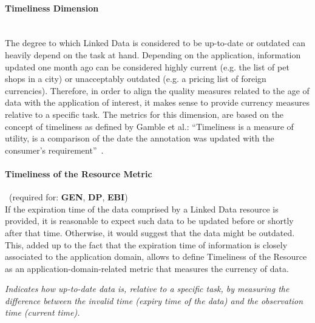 
\paragraph{Timeliness Dimension}~\\ %
The degree to which Linked Data is considered to be up-to-date or outdated can heavily depend on the task at hand. Depending on the application, information updated one month ago can be considered highly current (e.g. the list of pet shops in a city) or unacceptably outdated (e.g. a pricing list of foreign currencies). Therefore, in order to align the quality measures related to the age of data with the application of interest, it makes sense to provide currency measures relative to a specific task. The metrics for this dimension, are based on the concept of timeliness as defined by Gamble et al.: ``Timeliness is a measure of utility, is a comparison of the date the annotation was updated with the consumer's requirement''~\cite{Gamble2011}.

\paragraph{Timeliness of the Resource Metric}~(required for: \textbf{GEN}, \textbf{DP}, \textbf{EBI})~\\ %
If the expiration time of the data comprised by a Linked Data resource is provided, it is reasonable to expect such data to be updated before or shortly after that time. Otherwise, it would suggest that the data might be outdated. This, added up to the fact that the expiration time of information is closely associated to the application domain, allows to define Timeliness of the Resource as an application-domain-related metric that measures the currency of data.
\begin{mdframed}[style=metricdefinition]
\emph{Indicates how up-to-date data is, relative to a specific task, by measuring the difference between the invalid time (expiry time of the data) and the observation time (current time).}
\end{mdframed}

